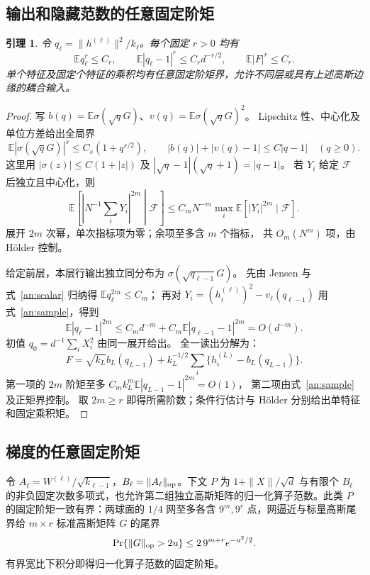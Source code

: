 \documentclass[a4paper]{tufte-handout}
\newtheorem{lemma}{引理}
\newcommand{\E}{\mathbb E}
\begin{document}
\begin{fullwidth}
\subsection{输出和隐藏范数的任意固定阶矩}
\begin{lemma}\label{an:moments}
令 $q_\ell=\|h^{(\ell)}\|^2/k_\ell$。每个固定 $r>0$ 均有
\[
 \mathbb E q_\ell^r\le C_r,\qquad
 \mathbb E|q_\ell-1|^r\le C_r d^{-r/2},\qquad
 \mathbb E|F|^r\le C_r.
\]
单个特征及固定个特征的乘积均有任意固定阶矩界，允许不同层或具有上述高斯边缘的耦合输入。
\end{lemma}
\begin{proof}
写 $b(q)=\E\sigma(\sqrt qG)$、$v(q)=\E\sigma(\sqrt qG)^2$。
Lipschitz 性、中心化及单位方差给出全局界
\begin{equation}\label{an:scalar}
 \E|\sigma(\sqrt qG)|^s\le C_s(1+q^{s/2}),\qquad
 |b(q)|+|v(q)-1|\le C|q-1|\quad(q\ge0).
\end{equation}
这里用 $|\sigma(z)|\le C(1+|z|)$ 及
$|\sqrt q-1|(\sqrt q+1)=|q-1|$。
若 $Y_i$ 给定 $\mathcal F$ 后独立且中心化，则
\begin{equation}\label{an:sample}
 \E\left[\left|N^{-1}\sum_iY_i\right|^{2m}\middle|\mathcal F\right]
 \le C_mN^{-m}\max_i\E[|Y_i|^{2m}\mid\mathcal F].
\end{equation}
展开 $2m$ 次幂，单次指标项为零；余项至多含 $m$ 个指标，
共 $O_m(N^m)$ 项，由 H\"older 控制。

给定前层，本层行输出独立同分布为 $\sigma(\sqrt{q_{\ell-1}}G)$。
先由 Jensen 与式~\eqref{an:scalar} 归纳得 $\E q_\ell^{2m}\le C_m$；
再对 $Y_i=(h_i^{(\ell)})^2-v_\ell(q_{\ell-1})$ 用式~\eqref{an:sample}，得到
\[
 \E|q_\ell-1|^{2m}\le C_md^{-m}+C_m\E|q_{\ell-1}-1|^{2m}=O(d^{-m}).
\]
初值 $q_0=d^{-1}\sum_iX_i^2$ 由同一展开给出。
全一读出分解为：
\[
 F=\sqrt{k_L}b_L(q_{L-1})+
 k_L^{-1/2}\sum_i\{h_i^{(L)}-b_L(q_{L-1})\}.
\]
第一项的 $2m$ 阶矩至多 $C_mk_L^m\E|q_{L-1}-1|^{2m}=O(1)$，
第二项由式~\eqref{an:sample} 及正矩界控制。
取 $2m\ge r$ 即得所需阶数；条件行估计与 H\"older 分别给出单特征和固定乘积矩。
\end{proof}

\subsection{梯度的任意固定阶矩}
令 $A_\ell=W^{(\ell)}/\sqrt{k_{\ell-1}}$，$B_\ell=\|A_\ell\|_{\rm op}$。下文 $P$ 为 $1+\|X\|/\sqrt d$ 与有限个 $B_\ell$ 的非负固定次数多项式，也允许第二组独立高斯矩阵的归一化算子范数。此类 $P$ 的固定阶矩一致有界：两球面的 $1/4$ 网至多各含
$9^m,9^r$ 点，网逼近与标量高斯尾界给 $m\times r$ 标准高斯矩阵 $G$ 的尾界
\[
 \Pr\{\|G\|_{\rm op}>2u\}\le2\,9^{m+r}e^{-u^2/2}.
\]
有界宽比下积分即得归一化算子范数的固定阶矩。


\end{fullwidth}
\end{document}
